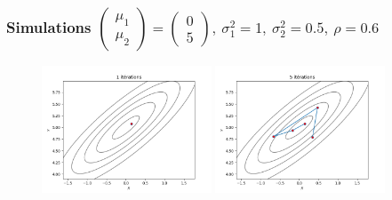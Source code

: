 \begin{frame}
    \frametitle{Simulations \normalsize
    $
    \left(\begin{array}{l}
        {\mu_{1}} \\
        {\mu_{2}}
    \end{array}\right) = 
    \left(\begin{array}{l}
        {0}\\
        {5}
    \end{array}\right)
    , \
    \sigma_1^2 = 1 ,\ \sigma_2^2 = 0.5,\ \rho = 0.6
    $}
    \begin{figure}
        \includegraphics[width=0.45\textwidth]{../MCMC_numeric/simu/simu_1.png} 
        \includegraphics[width=0.45\textwidth]{../MCMC_numeric/simu/simu_5.png} 
       \end{figure}
\end{frame}

